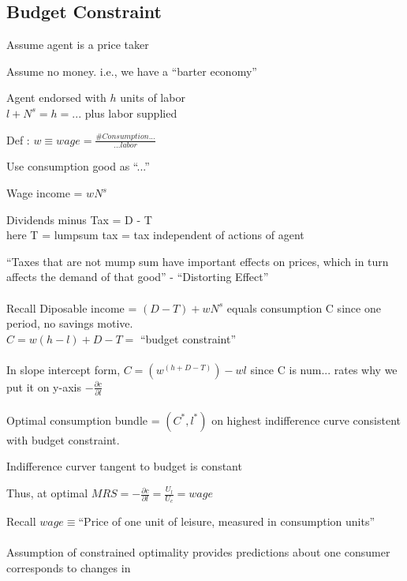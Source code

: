 \subsection*{Budget Constraint}
\begin{list}{-}{}
\item Assume agent is a price taker
\item Assume no money. i.e., we have a ``barter economy''
\item Agent endorsed with $h$ units of labor \\ $l + N^s = h = $... plus labor supplied \\
\end{list}
Def : $ w \equiv wage = \frac{\# Consumption ...}{... labor}$\\
\begin{list}{-}{}
\item Use consumption good as ``...''
\item Wage income = $ w N^s$
\item Dividends minus Tax = D - T \\ here T = lumpsum tax = tax independent of actions of agent\\
\end{list}
``Taxes that are not mump sum have important effects on prices, which in turn affects the demand of that good'' - ``Distorting Effect'' \\ \\
Recall Diposable income = $(D-T) + w N^s$ equals consumption C since one period, no savings motive.\\
$ C = w (h - l) + D - T = $ ``budget constraint'' \\ \\
In slope intercept form, $C = (w^(h+D-T)) - wl$ since C is num... rates why we put it on y-axis $-\frac{\partial c}{\partial l}$\\ \\
Optimal consumption bundle = $(C^*, l^*)$ on highest indifference curve consistent with budget constraint.
\begin{list}{-}{}
\item Indifference curver tangent to budget is constant
\item Thus, at optimal $MRS  = -\frac{\partial c}{\partial l} = \frac{U_l}{U_c} = wage$
\end{list}
Recall $wage \equiv $``Price of one unit of leisure, measured in consumption units'' \\ \\
Assumption of constrained optimality provides predictions about one consumer corresponds to changes in 
